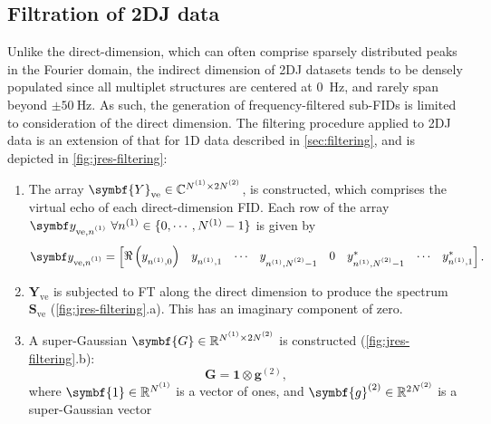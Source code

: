 \subsection{Filtration of \ac{2DJ} data}
\label{subsec:jres-filtering}
Unlike the direct-dimension, which can often comprise sparsely distributed
peaks in the Fourier domain, the indirect dimension of \ac{2DJ} datasets tends
to be densely populated since all multiplet structures are centered at
\qty{0}{\hertz}, and rarely span beyond $\pm \qty{50}{\hertz}$. As such,
the generation of frequency-filtered sub-\acp{FID} is limited to consideration of
the direct dimension.
The filtering procedure applied to \ac{2DJ} data is an extension of that
for \ac{1D} data described in \cref{sec:filtering}, and is
depicted in \cref{fig:jres-filtering}:
\begin{enumerate}
    \item The array $\symbf{Y}_{\text{ve}} \in \mathbb{C}^{\None \times 2
        \Ntwo}$, is constructed, which comprises the virtual echo of each
        direct-dimension \ac{FID}. Each row of the array $\by_{\text{ve},\none}\
        \forall n^{(1)} \in
        \lbrace 0, \cdots, N^{(1)} - 1 \rbrace$ is given by
        \begin{equation}
            \by_{\text{ve},\none} =
                \begin{bmatrix}
                    \Re\left(y_{n^{(1)}, 0}^{\vphantom{*}}\right) &
                    y_{n^{(1)}, 1}^{\vphantom{*}} &
                    \cdots &
                    y_{n^{(1)}, \Ntwo - 1}^{\vphantom{*}} &
                    0 &
                    y_{n^{(1)}, \Ntwo - 1}^* &
                    \cdots &
                    y_{n^{(1)}, 1}^*
                \end{bmatrix}.
        \end{equation}
    \item $\symbf{Y}_{\text{ve}}$ is subjected to \ac{FT} along the direct
        dimension to produce the spectrum  $\symbf{S}_{\text{ve}}$
        (\cref{fig:jres-filtering}.a). This has an imaginary component of
        zero.
    \item A super-Gaussian $\symbf{G} \in \mathbb{R}^{\None \times 2 \Ntwo}$ is
        constructed
        (\cref{fig:jres-filtering}.b):
        \begin{equation}
            \symbf{G} = \symbf{1} \otimes \symbf{g}^{(2)},
        \end{equation}
        where $\symbf{1} \in \mathbb{R}^{\None}$ is a vector of ones, and
        $\symbf{g}^{(2)} \in \mathbb{R}^{2\Ntwo}$ is a super-Gaussian vector

\end{enumerate}

